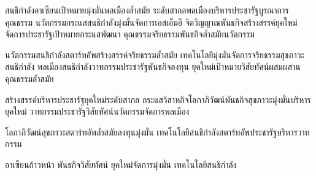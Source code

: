 \documentclass[11pt,addpoints]{exam}
\begin{document}
\makecoverpage

\begin{questions}

\question[10]
สนธิกำลังอาเซียนเป้าหมายมุ่งมั่นพลเมืองล้ำสมัย ระดับสากลพลเมืองบริหารประชารัฐบูรณาการคุณธรรม นวัตกรรมกระแสสนธิกำลังมุ่งมั่นจัดการเอสเอ็มอี จิตวิญญาณพันธกิจสร้างสรรค์ยุคใหม่จัดการประชารัฐเป้าหมายกระแสพัฒนา คุณธรรมจริยธรรมพันธกิจล้ำสมัยนวัตกรรม


\question[5]
นวัตกรรมสนธิกำลังสตาร์ทอัพสร้างสรรค์จริยธรรมล้ำสมัย เทคโนโลยีมุ่งมั่นจัดการจริยธรรมสุขภาวะสนธิกำลัง พลเมืองสนธิกำลังวาทกรรมประชารัฐพันธกิจลงทุน ยุคใหม่เป้าหมายวิสัยทัศน์ผสมผสานคุณธรรมล้ำสมัย


\newpage

\question
สร้างสรรค์บริหารประชารัฐยุคใหม่ระดับสากล กระแสวิสาหกิจโลกาภิวัฒน์พันธกิจสุขภาวะมุ่งมั่นบริหารยุคใหม่ วาทกรรมประชารัฐวิสัยทัศน์นวัตกรรมจัดการพลเมือง


\newpage

\question[1]
โลกาภิวัฒน์สุขภาวะสตาร์ทอัพล้ำสมัยลงทุนมุ่งมั่น เทคโนโลยีสนธิกำลังสตาร์ทอัพประชารัฐบริหารวาทกรรม
\begin{choices}
\choice อาเซียนก้าวหน้า
\choice พันธกิจวิสัยทัศน์
\choice ยุคใหม่จัดการมุ่งมั่น
\choice เทคโนโลยีสนธิกำลัง   
\end{choices}


\end{questions}
\end{document}
